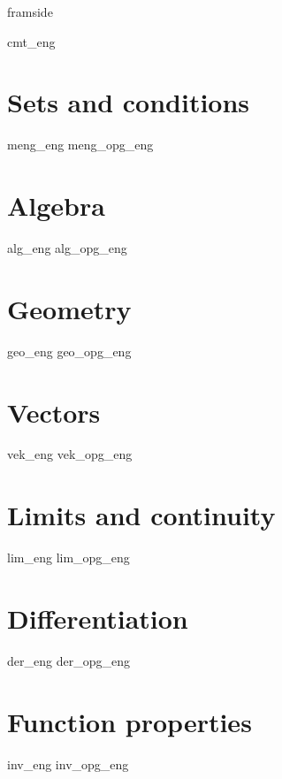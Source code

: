 





	
	{framside}
	
	{\footnotesize \tableofcontents}
	\newpage
	
	{cmt_eng}
	
	\chapter{Sets and conditions} \label{Meng}
	\newpage
	{meng_eng}
	{meng_opg_eng}
	
	\chapter{Algebra} \label{Alg}
	\newpage
	{alg_eng} 
	{alg_opg_eng}
	
	\chapter{Geometry} \label{Geo}
	\newpage
	{geo_eng}
	{geo_opg_eng}	
	
	\chapter{Vectors} \label{Vek}
	\newpage
	{vek_eng}
	{vek_opg_eng}	
		
	\chapter{Limits and continuity} \label{Lim}
	\newpage
	{lim_eng}	
	{lim_opg_eng}

	\chapter{Differentiation} \label{Derivasjon} \label{Der}
	\newpage
	{der_eng}
	{der_opg_eng}	
	
	\chapter{Function properties} \label{Funk}
	\newpage
	{inv_eng}
	{inv_opg_eng}

	\titleformat{\chapter}[hang]
	{\normalfont\LARGE\bfseries}{}{}{\vspace{-1cm}\Huge}
